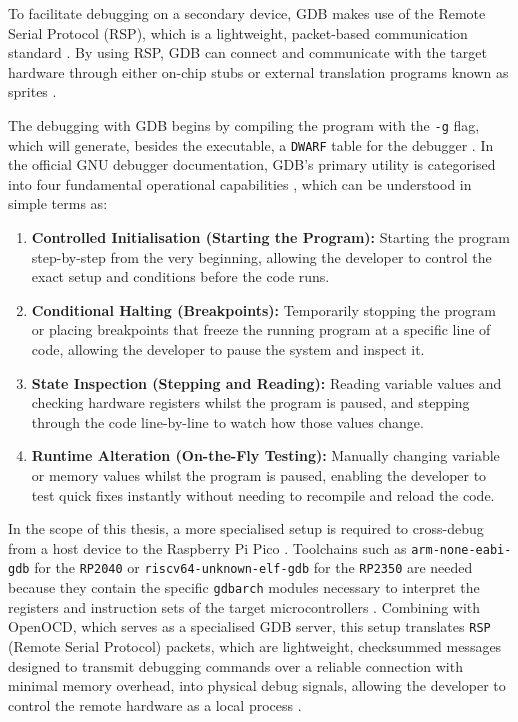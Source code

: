 To facilitate debugging on a secondary device, GDB makes use of the Remote Serial Protocol (RSP), which is a lightweight, packet-based communication standard \cite{gdb_architecture}. By using RSP, GDB can connect and communicate with the target hardware through either on-chip stubs or external translation programs known as sprites \cite{gdb_architecture}.

The debugging with GDB begins by compiling the program with the \texttt{-g} flag, which will generate, besides the executable, a \texttt{DWARF} table for the debugger \cite{gdb_manual}. In the official GNU debugger documentation, GDB's primary utility is categorised into four fundamental operational capabilities \cite{gdb_manual}, which can be understood in simple terms as:
\begin{enumerate}
    \item \textbf{Controlled Initialisation (Starting the Program):} Starting the program step-by-step from the very beginning, allowing the developer to control the exact setup and conditions before the code runs.
    \item \textbf{Conditional Halting (Breakpoints):} Temporarily stopping the program or placing breakpoints that freeze the running program at a specific line of code, allowing the developer to pause the system and inspect it.
    \item \textbf{State Inspection (Stepping and Reading):} Reading variable values and checking hardware registers whilst the program is paused, and stepping through the code line-by-line to watch how those values change.
    \item \textbf{Runtime Alteration (On-the-Fly Testing):} Manually changing variable or memory values whilst the program is paused, enabling the developer to test quick fixes instantly without needing to recompile and reload the code.
\end{enumerate}

In the scope of this thesis, a more specialised setup is required to cross-debug from a host device to the Raspberry Pi Pico \cite{pico_getting_started}. Toolchains such as \texttt{arm-none-eabi-gdb} for the \texttt{RP2040} or \texttt{riscv64-unknown-elf-gdb} for the \texttt{RP2350} are needed because they contain the specific \texttt{gdbarch} modules necessary to interpret the registers and instruction sets of the target microcontrollers \cite{pico_getting_started}. Combining with OpenOCD, which serves as a specialised GDB server, this setup translates \texttt{RSP} (Remote Serial Protocol) packets, which are lightweight, checksummed messages designed to transmit debugging commands over a reliable connection with minimal memory overhead, into physical debug signals, allowing the developer to control the remote hardware as a local process \cite{pico_getting_started, gdb_architecture}.

